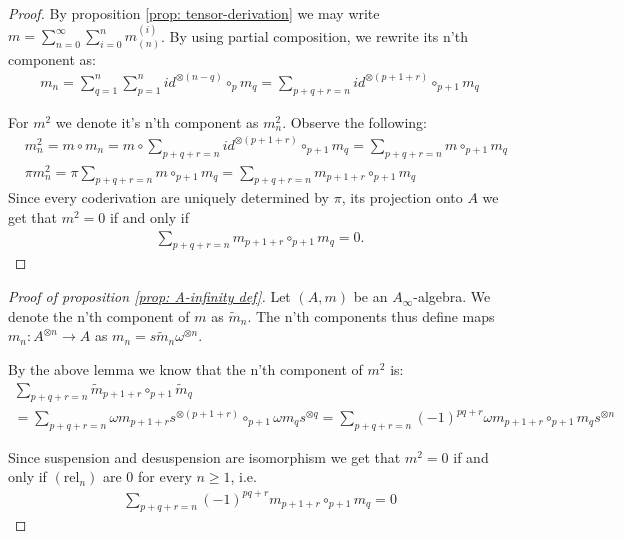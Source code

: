 \documentclass[../thesis.tex]{subfiles}
\begin{document}
        \begin{proof}
            By proposition \ref{prop: tensor-derivation} we may write $m = \sum_{n = 0}^\infty \sum_{i = 0}^n m_{(n)}^{(i)}$. By using partial composition, we rewrite its n'th component as:
            \begin{align*}
                m_n = \sum_{q=1}^n\sum_{p = 1}^n id^{\otimes (n-q)}\circ_{p} m_q = \sum_{p + q + r = n}id^{\otimes (p+1+r)}\circ_{p+1}m_q
            \end{align*}

            For $m^2$ we denote it's n'th component as $m^2_n$. Observe the following:
            \begin{align*}
                & m^2_n = m\circ m_n = m\circ \sum_{p + q + r = n}id^{\otimes (p+1+r)}\circ_{p+1}m_q = \sum_{p + q + r = n}m\circ_{p+1}m_q \\
                & \pi m^2_n = \pi \sum_{p + q + r = n}m\circ_{p+1}m_q = \sum_{p + q + r = n}m_{p+1+r}\circ_{p+1}m_q
            \end{align*}
            Since every coderivation are uniquely determined by $\pi$, its projection onto $A$ we get that $m^2 = 0$ if and only if
            \begin{align*}
                \sum_{p+q+r = n}m_{p+1+r}\circ_{p+1}m_q = 0\text{.}
            \end{align*}
        \end{proof}

        \begin{proof}[Proof of proposition \ref{prop: A-infinity def}]
            Let $(A,m)$ be an $A_\infty$-algebra. We denote the n'th component of $m$ as $\widetilde{m}_n$. The n'th components thus define maps $m_n:A^{\otimes n}\rightarrow A$ as $m_n = s\widetilde{m}_n \omega^{\otimes n}$.

            By the above lemma we know that the n'th component of $m^2$ is:
            \begin{multline*}
                \sum_{p + q + r = n}\widetilde{m}_{p+1+r}\circ_{p+1}\widetilde{m}_q \\
                = \sum_{p + q + r = n}\omega m_{p+1+r}s^{\otimes (p+1+r)}\circ_{p+1}\omega m_qs^{\otimes q} = \sum_{p + q + r = n}(-1)^{pq+r}\omega m_{p+1+r}\circ_{p+1}m_q s^{\otimes n}
            \end{multline*}

            Since suspension and desuspension are isomorphism we get that $m^2 = 0$ if and only if $(\text{rel}_n)$ are $0$ for every $n\geq 1$, i.e.
            \begin{align*}
                \sum_{p+q+r = n} (-1)^{pq+r} m_{p+1+r} \circ_{p+1} m_q = 0
            \end{align*}
        \end{proof}
\end{document}
